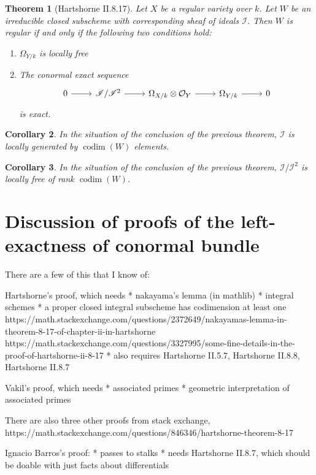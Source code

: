 \documentclass[a4paper]{article}
\newtheorem{thm}{Theorem}[section]
\newtheorem{cor}[thm]{Corollary}
\newcommand{\codim}{\operatorname{codim}}
\newcommand{\conormal}{\mathscr{I} / \mathscr{I}^{2}}
\begin{document}
\begin{thm}
	[Hartshorne II.8.17]
	Let \(X\) be a regular variety over \(k\).
	Let \(W\) be an irreducible closed subscheme 
	with corresponding sheaf of ideals \(\mathscr{I}\).
	Then \(W\) is regular if and only if the following
	two conditions hold:
	\begin{enumerate}[(1)]
		\item \(\Omega_{Y / k}\) is locally free
		\item The conormal exact sequence
			\[
			\begin{tikzcd}
			0 \arrow{r}{} & \conormal \arrow{r}{} & 
			\Omega_{X / k} \otimes \mathcal{O}_{Y}  \arrow{r}{} & 
			\Omega_{Y / k} \arrow{r}{} & 0
			\end{tikzcd}
			\]
			is exact.
	\end{enumerate}
\end{thm}

\begin{cor}
	In the situation of the conclusion of the previous theorem, 
	\(\mathscr{I}\) is locally generated by 
	\(\codim(W)\) elements.
\end{cor}

\begin{cor}
	In the situation of the conclusion of the previous theorem,
	\(\conormal\) is locally free of rank \(\codim(W)\).
\end{cor}

\section{Discussion of proofs of the left-exactness of conormal bundle}

There are a few of this that I know of:

Hartshorne's proof, which needs
* nakayama's lemma (in mathlib)
* integral schemes
* a proper closed integral subscheme has codimension at least one
https://math.stackexchange.com/questions/2372649/nakayamas-lemma-in-theorem-8-17-of-chapter-ii-in-hartshorne
https://math.stackexchange.com/questions/3327995/some-fine-details-in-the-proof-of-hartshorne-ii-8-17
* also requires Hartshorne II.5.7, Hartshorne II.8.8, Hartshorne II.8.7

Vakil's proof, which needs
* associated primes
* geometric interpretation of associated primes

There are also three other proofs from stack exchange,
https://math.stackexchange.com/questions/846346/hartshorne-theorem-8-17

Ignacio Barros's proof:
* passes to stalks
* needs Hartshorne II.8.7, which should be doable with just 
   facts about differentials
\end{document}
